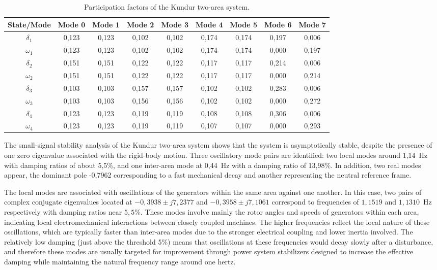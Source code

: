 \begin{table}[H]
\centering
\caption{Participation factors of the Kundur two-area system.}
\label{tab:pfactors_kundur}
\renewcommand{\arraystretch}{1.2}
\small
\begin{tabular}{|c|cccccccc|}
\hline
\textbf{State/Mode} & \textbf{Mode 0} & \textbf{Mode 1} & \textbf{Mode 2} & \textbf{Mode 3} & \textbf{Mode 4} & \textbf{Mode 5} & \textbf{Mode 6} & \textbf{Mode 7} \\ 
\hline
$\delta_1$ & 0,123 & 0,123 & 0,102 & 0,102 & 0,174 & 0,174 & 0,197 & 0,006 \\
$\omega_1$ & 0,123 & 0,123 & 0,102 & 0,102 & 0,174 & 0,174 & 0,000 & 0,197 \\
$\delta_2$ & 0,151 & 0,151 & 0,122 & 0,122 & 0,117 & 0,117 & 0,214 & 0,006 \\
$\omega_2$ & 0,151 & 0,151 & 0,122 & 0,122 & 0,117 & 0,117 & 0,000 & 0,214 \\
$\delta_3$ & 0,103 & 0,103 & 0,157 & 0,157 & 0,102 & 0,102 & 0,283 & 0,006 \\
$\omega_3$ & 0,103 & 0,103 & 0,156 & 0,156 & 0,102 & 0,102 & 0,000 & 0,272 \\
$\delta_4$ & 0,123 & 0,123 & 0,119 & 0,119 & 0,108 & 0,108 & 0,306 & 0,006 \\
$\omega_4$ & 0,123 & 0,123 & 0,119 & 0,119 & 0,107 & 0,107 & 0,000 & 0,293 \\
\hline
\end{tabular}
\end{table}



The small-signal stability analysis of the Kundur two-area system shows that the system is asymptotically stable, 
despite the presence of one zero eigenvalue associated with the rigid-body motion. Three oscillatory
mode pairs are identified: two local modes around 1,14~Hz with damping ratios of about 5,5\%, 
and one inter-area mode at 0,44~Hz with a damping ratio of 13,98\%. In addition, two real modes appear,
the dominant pole -0,7962 corresponding to a fast mechanical decay and another representing the neutral 
reference frame.

The local modes are associated with oscillations of the generators within the same area against one another. 
In this case, two pairs of complex conjugate eigenvalues located at $-0,3938 \pm j7,2377$ and $-0,3958 \pm j7,1061$ correspond to frequencies
 of $1,1519$ and $1,1310$~Hz respectively with damping ratios near $5,5\%$. These modes involve mainly the rotor angles and 
 speeds of generators within each area, indicating local electromechanical interactions between closely coupled machines. The higher frequencies reflect the local nature of these oscillations, which are typically faster than inter-area modes due to the stronger electrical coupling and lower inertia involved. 
 The relatively low damping (just above the threshold 5\%) means that oscillations at these frequencies would decay slowly after a 
 disturbance, and therefore these modes are usually targeted for improvement through power system stabilizers designed to increase 
 the effective damping while maintaining the natural frequency range around one hertz.

